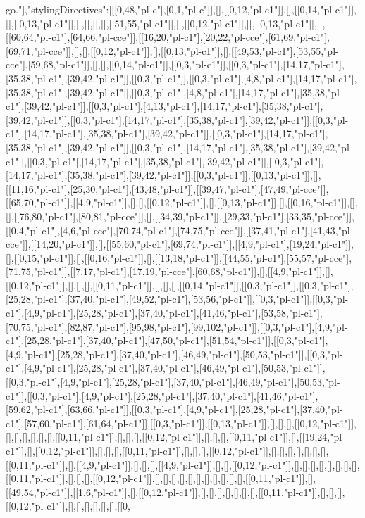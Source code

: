 go."],"stylingDirectives":[[[0,48,"pl-c"],[0,1,"pl-c"]],[],[[0,12,"pl-c1"]],[],[[0,14,"pl-c1"]],[],[[0,13,"pl-c1"]],[],[],[],[],[[51,55,"pl-c1"]],[],[[0,12,"pl-c1"]],[],[[0,13,"pl-c1"]],[],[[60,64,"pl-c1"],[64,66,"pl-cce"]],[[16,20,"pl-c1"],[20,22,"pl-cce"],[61,69,"pl-c1"],[69,71,"pl-cce"]],[],[],[[0,12,"pl-c1"]],[],[[0,13,"pl-c1"]],[],[[49,53,"pl-c1"],[53,55,"pl-cce"],[59,68,"pl-c1"]],[],[],[[0,14,"pl-c1"]],[[0,3,"pl-c1"]],[[0,3,"pl-c1"],[14,17,"pl-c1"],[35,38,"pl-c1"],[39,42,"pl-c1"]],[[0,3,"pl-c1"]],[[0,3,"pl-c1"],[4,8,"pl-c1"],[14,17,"pl-c1"],[35,38,"pl-c1"],[39,42,"pl-c1"]],[[0,3,"pl-c1"],[4,8,"pl-c1"],[14,17,"pl-c1"],[35,38,"pl-c1"],[39,42,"pl-c1"]],[[0,3,"pl-c1"],[4,13,"pl-c1"],[14,17,"pl-c1"],[35,38,"pl-c1"],[39,42,"pl-c1"]],[[0,3,"pl-c1"],[14,17,"pl-c1"],[35,38,"pl-c1"],[39,42,"pl-c1"]],[[0,3,"pl-c1"],[14,17,"pl-c1"],[35,38,"pl-c1"],[39,42,"pl-c1"]],[[0,3,"pl-c1"],[14,17,"pl-c1"],[35,38,"pl-c1"],[39,42,"pl-c1"]],[[0,3,"pl-c1"],[14,17,"pl-c1"],[35,38,"pl-c1"],[39,42,"pl-c1"]],[[0,3,"pl-c1"],[14,17,"pl-c1"],[35,38,"pl-c1"],[39,42,"pl-c1"]],[[0,3,"pl-c1"],[14,17,"pl-c1"],[35,38,"pl-c1"],[39,42,"pl-c1"]],[[0,3,"pl-c1"]],[[0,13,"pl-c1"]],[],[[11,16,"pl-c1"],[25,30,"pl-c1"],[43,48,"pl-c1"]],[[39,47,"pl-c1"],[47,49,"pl-cce"]],[[65,70,"pl-c1"]],[[4,9,"pl-c1"]],[],[],[[0,12,"pl-c1"]],[],[[0,13,"pl-c1"]],[],[[0,16,"pl-c1"]],[],[],[[76,80,"pl-c1"],[80,81,"pl-cce"]],[],[[34,39,"pl-c1"]],[[29,33,"pl-c1"],[33,35,"pl-cce"]],[[0,4,"pl-c1"],[4,6,"pl-cce"],[70,74,"pl-c1"],[74,75,"pl-cce"]],[[37,41,"pl-c1"],[41,43,"pl-cce"]],[[14,20,"pl-c1"]],[],[[55,60,"pl-c1"],[69,74,"pl-c1"]],[[4,9,"pl-c1"],[19,24,"pl-c1"]],[],[[0,15,"pl-c1"]],[],[[0,16,"pl-c1"]],[],[[13,18,"pl-c1"]],[[44,55,"pl-c1"],[55,57,"pl-cce"],[71,75,"pl-c1"]],[[7,17,"pl-c1"],[17,19,"pl-cce"],[60,68,"pl-c1"]],[],[[4,9,"pl-c1"]],[],[[0,12,"pl-c1"]],[],[],[],[[0,11,"pl-c1"]],[],[],[],[[0,14,"pl-c1"]],[[0,3,"pl-c1"]],[[0,3,"pl-c1"],[25,28,"pl-c1"],[37,40,"pl-c1"],[49,52,"pl-c1"],[53,56,"pl-c1"]],[[0,3,"pl-c1"]],[[0,3,"pl-c1"],[4,9,"pl-c1"],[25,28,"pl-c1"],[37,40,"pl-c1"],[41,46,"pl-c1"],[53,58,"pl-c1"],[70,75,"pl-c1"],[82,87,"pl-c1"],[95,98,"pl-c1"],[99,102,"pl-c1"]],[[0,3,"pl-c1"],[4,9,"pl-c1"],[25,28,"pl-c1"],[37,40,"pl-c1"],[47,50,"pl-c1"],[51,54,"pl-c1"]],[[0,3,"pl-c1"],[4,9,"pl-c1"],[25,28,"pl-c1"],[37,40,"pl-c1"],[46,49,"pl-c1"],[50,53,"pl-c1"]],[[0,3,"pl-c1"],[4,9,"pl-c1"],[25,28,"pl-c1"],[37,40,"pl-c1"],[46,49,"pl-c1"],[50,53,"pl-c1"]],[[0,3,"pl-c1"],[4,9,"pl-c1"],[25,28,"pl-c1"],[37,40,"pl-c1"],[46,49,"pl-c1"],[50,53,"pl-c1"]],[[0,3,"pl-c1"],[4,9,"pl-c1"],[25,28,"pl-c1"],[37,40,"pl-c1"],[41,46,"pl-c1"],[59,62,"pl-c1"],[63,66,"pl-c1"]],[[0,3,"pl-c1"],[4,9,"pl-c1"],[25,28,"pl-c1"],[37,40,"pl-c1"],[57,60,"pl-c1"],[61,64,"pl-c1"]],[[0,3,"pl-c1"]],[[0,13,"pl-c1"]],[],[],[],[[0,12,"pl-c1"]],[],[],[],[],[],[],[[0,11,"pl-c1"]],[],[],[],[[0,12,"pl-c1"]],[],[],[],[[0,11,"pl-c1"]],[],[[19,24,"pl-c1"]],[],[[0,12,"pl-c1"]],[],[],[],[[0,11,"pl-c1"]],[],[],[],[[0,12,"pl-c1"]],[],[],[],[],[],[],[],[[0,11,"pl-c1"]],[],[[4,9,"pl-c1"]],[],[],[],[[4,9,"pl-c1"]],[],[],[[0,12,"pl-c1"]],[],[],[],[],[],[],[],[],[[0,11,"pl-c1"]],[],[],[],[[0,12,"pl-c1"]],[],[],[],[],[],[],[],[],[],[],[],[[0,11,"pl-c1"]],[],[[49,54,"pl-c1"]],[[1,6,"pl-c1"]],[],[[0,12,"pl-c1"]],[],[],[],[],[],[],[],[[0,11,"pl-c1"]],[],[],[],[[0,12,"pl-c1"]],[],[],[],[],[],[],[[0,